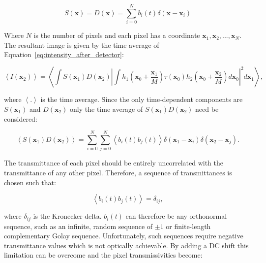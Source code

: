 \begin{equation}\label{eq:detector_aperture_time}
S\left(\textbf{x}\right) = D\left(\textbf{x}\right) = \sum_{i=0}^{N} b_{i}\left(t\right)\delta\left(\textbf{x} - \textbf{x}_{i}\right)
\end{equation}

Where $N$ is the number of pixels and each pixel has a 
coordinate $\textbf{x}_{1}, \textbf{x}_{2},...,\textbf{x}_{N}$. 
The resultant image is given by the time average of 
Equation~\ref{eq:intensity_after_detector}:

\begin{equation}\label{eq:confocal_image_time_ave}
\left\langle I\left(\textbf{x}_{2}\right)\right\rangle = \left\langle \int S\left(\textbf{x}_{1}\right) D\left(\textbf{x}_{2}\right) \left| \int h_{1}\left(\textbf{x}_{0} + \frac{\textbf{x}_{1}}{M}\right) \tau\left(\textbf{x}_{0}\right) h_{2}\left(\textbf{x}_{0} + \frac{\textbf{x}_{2}}{M}\right)d\textbf{x}_{0}\right|^{2}d\textbf{x}_{1}\right\rangle,
\end{equation}

where $\left\langle . \right\rangle$ is the time average. 
Since the only time-dependent components are 
$S\left(\textbf{x}_{1}\right)$ and $D\left(\textbf{x}_{2}\right)$ 
only the time average of 
$S\left(\textbf{x}_{1}\right) D\left(\textbf{x}_{2}\right)$ 
need be considered:

\begin{equation}\label{eq:SD_time_ave}
\left\langle S\left(\textbf{x}_{1}\right) D\left(\textbf{x}_{2}\right)\right\rangle = \sum_{i=0}^{N}\sum_{j=0}^{N} \left\langle b_{i}\left(t\right) b_{j}\left(t\right)\right\rangle \delta\left(\textbf{x}_{1} - \textbf{x}_{i}\right) \delta\left(\textbf{x}_{2} - \textbf{x}_{j}\right).
\end{equation}

The transmittance of each pixel should be entirely 
uncorrelated with the transmittance of any other pixel. 
Therefore, a sequence of transmittances is chosen such that:

\begin{equation}\label{eq:pixel_uncorrelation}
\left\langle b_{i}\left(t\right) b_{j}\left(t\right)\right\rangle = \delta_{ij},
\end{equation}

where $\delta_{ij}$ is the Kronecker delta. $b_{i}\left(t\right)$ 
can therefore be any orthonormal sequence, such as an infinite, 
random sequence of $\pm1$ or finite-length complementary Golay 
sequence\cite{golay1949multi}. Unfortunately, such sequences 
require negative transmittance values which is not optically 
achievable. By adding a DC shift this limitation can be overcome 
and the pixel transmissivities become:

